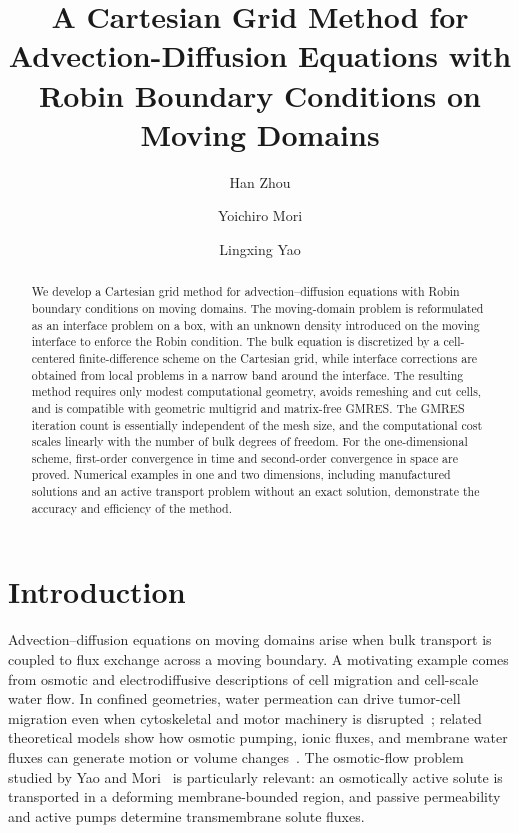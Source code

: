 \documentclass[11pt,reqno]{amsart}
\title[Cartesian grid method for moving-domain advection-diffusion equations]{A Cartesian Grid Method for Advection-Diffusion Equations with Robin Boundary Conditions on Moving Domains}
\author{Han Zhou}
\author{Yoichiro Mori}
\author{Lingxing Yao}
\theoremstyle{plain}
\theoremstyle{definition}
\numberwithin{equation}{section}
\begin{document}
\begin{abstract}
We develop a Cartesian grid method for advection--diffusion equations with Robin boundary conditions on moving domains.
The moving-domain problem is reformulated as an interface problem on a box, with an unknown density introduced on the moving interface to enforce the Robin condition.
The bulk equation is discretized by a cell-centered finite-difference scheme on the Cartesian grid, while interface corrections are obtained from local problems in a narrow band around the interface.
The resulting method requires only modest computational geometry, avoids remeshing and cut cells, and is compatible with geometric multigrid and matrix-free GMRES.
The GMRES iteration count is essentially independent of the mesh size, and the computational cost scales linearly with the number of bulk degrees of freedom.
For the one-dimensional scheme, first-order convergence in time and second-order convergence in space are proved.
Numerical examples in one and two dimensions, including manufactured solutions and an active transport problem without an exact solution, demonstrate the accuracy and efficiency of the method.
\end{abstract}

\maketitle


\section{Introduction}
Advection--diffusion equations on moving domains arise when bulk transport is coupled to flux exchange across a moving boundary. A motivating example comes from osmotic and electrodiffusive descriptions of cell migration and cell-scale water flow. In confined geometries, water permeation can drive tumor-cell migration even when cytoskeletal and motor machinery is disrupted~\cite{Stroka2014}; related theoretical models show how osmotic pumping, ionic fluxes, and membrane water fluxes can generate motion or volume changes~\cite{AtzbergerIsaacsonPeskin2009,Mori2011,LiMoriSun2015}. The osmotic-flow problem studied by Yao and Mori~\cite{Yao2017} is particularly relevant: an osmotically active solute is transported in a deforming membrane-bounded region, and passive permeability and active pumps determine transmembrane solute fluxes. 
\end{document}

